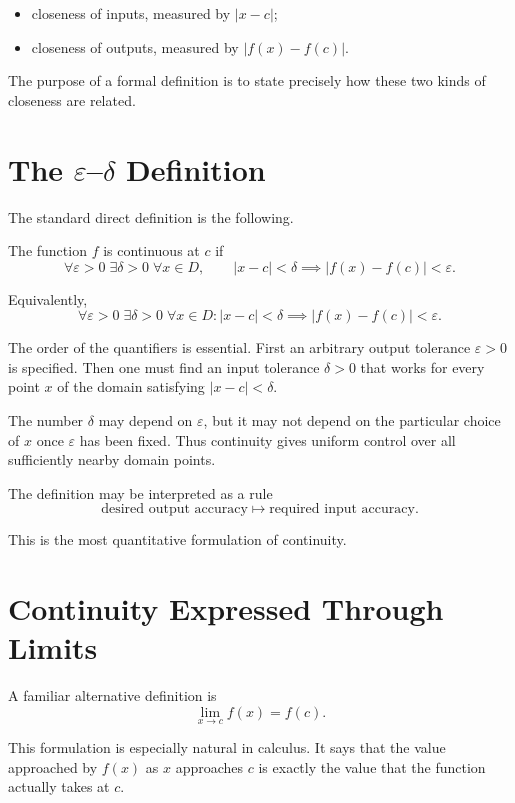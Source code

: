 \documentclass{essay}
\begin{document}
\begin{itemize}
  \item closeness of inputs, measured by \(|x-c|\);
  \item closeness of outputs, measured by \(|f(x)-f(c)|\).
\end{itemize}

The purpose of a formal definition is to state precisely how these two kinds of closeness are related.

\section{The \(\varepsilon\)--\(\delta\) Definition}

The standard direct definition is the following.

The function \(f\) is continuous at \(c\) if
\[ \forall \varepsilon>0\;\exists\delta>0\;\forall x\in D, \qquad |x-c|<\delta \implies |f(x)-f(c)|<\varepsilon. \]

Equivalently,
\[ \boxed{ \forall \varepsilon>0\;\exists\delta>0\;\forall x\in D: |x-c|<\delta \implies |f(x)-f(c)|<\varepsilon. } \]

The order of the quantifiers is essential. First an arbitrary output tolerance \(\varepsilon>0\) is specified. Then one must find an input tolerance \(\delta>0\) that works for every point \(x\) of the domain satisfying \(|x-c|<\delta\).

The number \(\delta\) may depend on \(\varepsilon\), but it may not depend on the particular choice of \(x\) once \(\varepsilon\) has been fixed. Thus continuity gives uniform control over all sufficiently nearby domain points.

The definition may be interpreted as a rule
\[ \text{desired output accuracy} \longmapsto \text{required input accuracy}. \]

This is the most quantitative formulation of continuity.

\section{Continuity Expressed Through Limits}

A familiar alternative definition is
\[ \boxed{ \lim_{x\to c} f(x)=f(c). } \]

This formulation is especially natural in calculus. It says that the value approached by \(f(x)\) as \(x\) approaches \(c\) is exactly the value that the function actually takes at \(c\).
\end{document}

